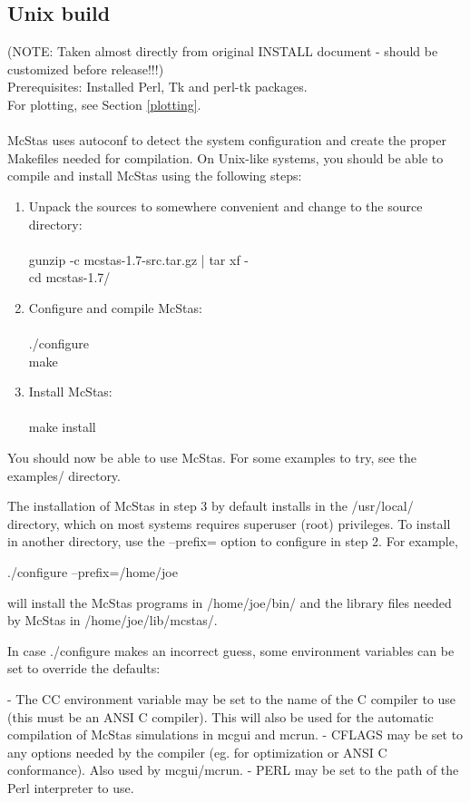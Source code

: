 \documentclass[a4paper,12pt]{article}
\begin{document}
\subsection{Unix build}
(NOTE: Taken almost directly from original INSTALL document - should
be customized before release!!!)\\
Prerequisites: Installed Perl, Tk and perl-tk packages.\\
For plotting, see Section \ref{plotting}.\\\ \\
McStas uses autoconf to detect the system configuration and create the
proper Makefiles needed for compilation. On Unix-like systems, you
should be able to compile and install McStas using the following steps:
\begin{enumerate}
\item{Unpack the sources to somewhere convenient and change to the
    source directory:\\\ \\

  gunzip -c mcstas-1.7-src.tar.gz | tar xf -\\
  cd mcstas-1.7/}

\item{Configure and compile McStas:\\\ \\

  ./configure\\
  make}
\item{Install McStas:\\\ \\

  make install}
\end{enumerate}
You should now be able to use McStas. For some examples to try, see the
examples/ directory.

The installation of McStas in step 3 by default installs in the
/usr/local/ directory, which on most systems requires superuser (root)
privileges. To install in another directory, use the --prefix= option to
configure in step 2. For example,

  ./configure --prefix=/home/joe

will install the McStas programs in /home/joe/bin/ and the library files
needed by McStas in /home/joe/lib/mcstas/.

In case ./configure makes an incorrect guess, some environment variables
can be set to override the defaults:

 - The CC environment variable may be set to the name of the C compiler
   to use (this must be an ANSI C compiler). This will also be used for
   the automatic compilation of McStas simulations in mcgui and mcrun.
 - CFLAGS may be set to any options needed by the compiler (eg. for
   optimization or ANSI C conformance). Also used by mcgui/mcrun.
 - PERL may be set to the path of the Perl interpreter to use.
\end{document}

